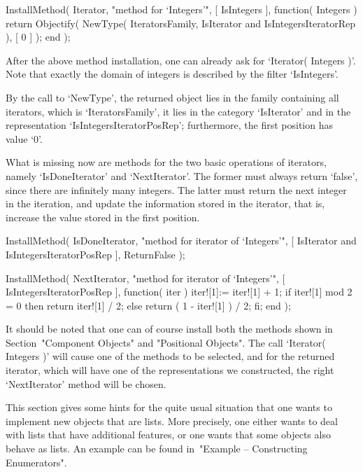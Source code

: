 \begintt
InstallMethod( Iterator,
    "method for `Integers'",
    [ IsIntegers ],
    function( Integers )
    return Objectify( NewType( IteratorsFamily,
                                   IsIterator
                               and IsIntegersIteratorRep ),
                      [ 0 ] );
    end );
\endtt

After the above method installation, one can already ask for
`Iterator( Integers )'.
Note that exactly the domain of integers is described by
the filter `IsIntegers'.

By the call to `NewType', the returned object lies in the family
containing all iterators, which is `IteratorsFamily',
it lies in the category `IsIterator' and in the representation
`IsIntegersIteratorPosRep';
furthermore, the first position has value `0'.

What is missing now are methods for the two basic operations
of iterators, namely `IsDoneIterator' and `NextIterator'.
The former must always return `false', since there are infinitely
many integers.
The latter must return the next integer in the iteration,
and update the information stored in the iterator,
that is, increase the value stored in the first position.

\begintt
InstallMethod( IsDoneIterator,
    "method for iterator of `Integers'",
    [ IsIterator and IsIntegersIteratorPosRep ],
    ReturnFalse );

InstallMethod( NextIterator,
    "method for iterator of `Integers'",
    [ IsIntegersIteratorPosRep ],
    function( iter )
    iter![1]:= iter![1] + 1;
    if iter![1] mod 2 = 0 then
      return iter![1] / 2;
    else
      return ( 1 - iter![1] ) / 2;
    fi;
    end );
\endtt

It should be noted that one can of course install both the methods shown
in Section~"Component Objects" and "Positional Objects".
The call `Iterator( Integers )' will cause one of the methods to be
selected, and for the returned iterator, which will have one of the
representations we constructed, the right `NextIterator' method
will be chosen.


This section gives some hints for the quite usual situation that one wants
to implement new objects that are lists.
More precisely, one either wants to deal with lists that have additional
features, or one wants that some objects also behave as lists.
An example can be found in~"Example -- Constructing Enumerators".

